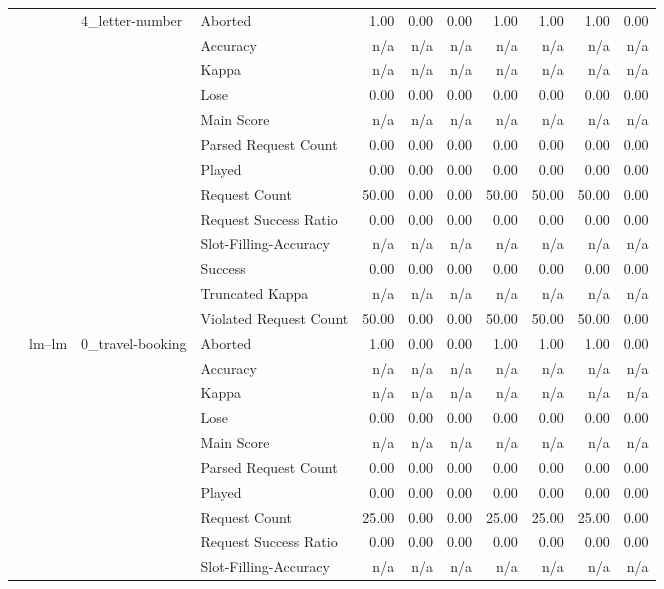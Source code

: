 \begin{tabular}{llllrrrrrrr}
\cline{3-11}
 &  & \multirow[t]{13}{*}{4_letter-number} & Aborted & 1.00 & 0.00 & 0.00 & 1.00 & 1.00 & 1.00 & 0.00 \\
 &  &  & Accuracy & n/a & n/a & n/a & n/a & n/a & n/a & n/a \\
 &  &  & Kappa & n/a & n/a & n/a & n/a & n/a & n/a & n/a \\
 &  &  & Lose & 0.00 & 0.00 & 0.00 & 0.00 & 0.00 & 0.00 & 0.00 \\
 &  &  & Main Score & n/a & n/a & n/a & n/a & n/a & n/a & n/a \\
 &  &  & Parsed Request Count & 0.00 & 0.00 & 0.00 & 0.00 & 0.00 & 0.00 & 0.00 \\
 &  &  & Played & 0.00 & 0.00 & 0.00 & 0.00 & 0.00 & 0.00 & 0.00 \\
 &  &  & Request Count & 50.00 & 0.00 & 0.00 & 50.00 & 50.00 & 50.00 & 0.00 \\
 &  &  & Request Success Ratio & 0.00 & 0.00 & 0.00 & 0.00 & 0.00 & 0.00 & 0.00 \\
 &  &  & Slot-Filling-Accuracy & n/a & n/a & n/a & n/a & n/a & n/a & n/a \\
 &  &  & Success & 0.00 & 0.00 & 0.00 & 0.00 & 0.00 & 0.00 & 0.00 \\
 &  &  & Truncated Kappa & n/a & n/a & n/a & n/a & n/a & n/a & n/a \\
 &  &  & Violated Request Count & 50.00 & 0.00 & 0.00 & 50.00 & 50.00 & 50.00 & 0.00 \\
\cline{2-11} \cline{3-11}
 & \multirow[t]{65}{*}{lm--lm} & \multirow[t]{13}{*}{0_travel-booking} & Aborted & 1.00 & 0.00 & 0.00 & 1.00 & 1.00 & 1.00 & 0.00 \\
 &  &  & Accuracy & n/a & n/a & n/a & n/a & n/a & n/a & n/a \\
 &  &  & Kappa & n/a & n/a & n/a & n/a & n/a & n/a & n/a \\
 &  &  & Lose & 0.00 & 0.00 & 0.00 & 0.00 & 0.00 & 0.00 & 0.00 \\
 &  &  & Main Score & n/a & n/a & n/a & n/a & n/a & n/a & n/a \\
 &  &  & Parsed Request Count & 0.00 & 0.00 & 0.00 & 0.00 & 0.00 & 0.00 & 0.00 \\
 &  &  & Played & 0.00 & 0.00 & 0.00 & 0.00 & 0.00 & 0.00 & 0.00 \\
 &  &  & Request Count & 25.00 & 0.00 & 0.00 & 25.00 & 25.00 & 25.00 & 0.00 \\
 &  &  & Request Success Ratio & 0.00 & 0.00 & 0.00 & 0.00 & 0.00 & 0.00 & 0.00 \\
 &  &  & Slot-Filling-Accuracy & n/a & n/a & n/a & n/a & n/a & n/a & n/a \\

\end{tabular}
